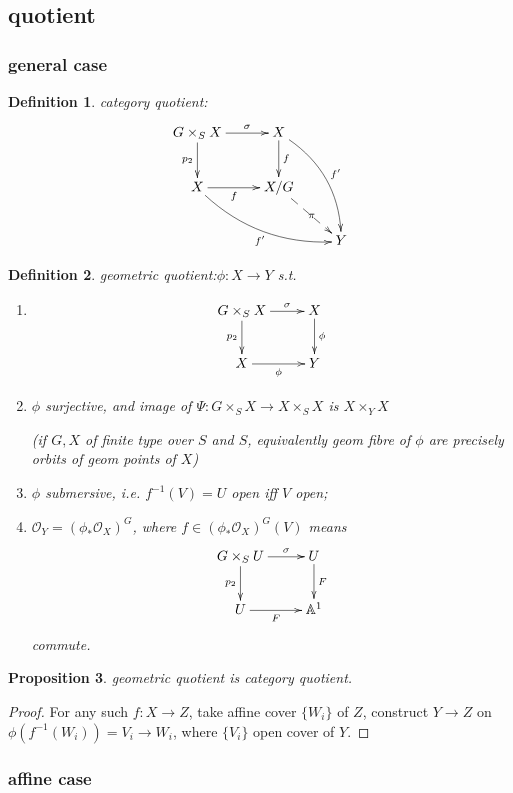 \documentclass{article}
\newtheorem{defn}{Definition}[section]
\newtheorem{prop}[defn]{Proposition}
\begin{document}
\subsection{quotient}
\subsubsection{general case}
\begin{defn}
	category quotient:
		$$
	\xymatrix{
		G\times_S X \ar[d]_-{p_2} \ar[r]^-{\sigma} & X \ar[d]^-{f }\ar@/^3ex/[ddr]^-{f'}\\
		X \ar[r]_-{f}\ar@/_3ex/[rrd]_-{f'} & X/G \ar@{-->}[dr]|-{\pi } \\
		& & Y 
	}
	$$
\end{defn}

\begin{defn}
	geometric quotient:$ \phi: X\to Y  $ s.t.
	\begin{enumerate}
		\item $$
		\xymatrix{
			G\times_S X \ar[d]_-{p_2} \ar[r]^-{\sigma} & X \ar[d]^-{\phi }\\
			X \ar[r]_-{\phi} & Y 
		}
		$$
		\item $ \phi $ surjective, and image of $ \Psi:G\times _SX\to X\times_SX $ is $ X\times_YX $
		
		(if $ G,X $ of finite type over $ S $ and $ S $, equivalently  geom fibre of $ \phi $ are precisely orbits of geom points of $ X $)
		\item $ \phi $ submersive, i.e. $ f^{-1}(V)=U $ open iff $ V $ open;
		\item $ \mathcal{O}_Y=(\phi_*\mathcal{O}_X)^G $, where $ f\in(\phi_*\mathcal{O}_X)^G(V)  $ means
		$$ 	\xymatrix{
			G\times_S U \ar[d]_-{p_2} \ar[r]^-{\sigma} & U \ar[d]^-{F }\\
			U \ar[r]_-{F} & \mathbb{A}^1
		}$$
	commute.
	\end{enumerate}
\end{defn}

\begin{prop}
	geometric quotient is category quotient.
\end{prop}
\begin{proof}
	For any such $ f:X\to Z $, take affine cover $ \{W_i\} $ of $ Z $, construct $ Y\to Z $ on $ \phi(f^{-1}(W_i))=V_i\to W_i $, where $ \{ V_i \} $ open cover of $ Y $.
\end{proof}

\subsubsection{affine case}
\end{document}
